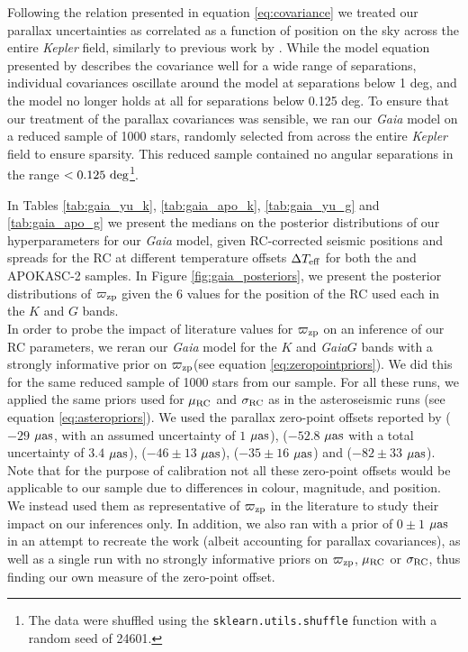 \documentclass[fleqn,usenatbib]{mnras}
\newcommand{\oozp}{\mbox{$\varpi_{\rm zp}$}\xspace}
\newcommand{\muas}{\mbox{$\mu \rm as$}\xspace}
\newcommand{\murc}{\mbox{$\mu_{\rm RC}$}\xspace}
\newcommand{\sigrc}{\mbox{$\sigma_{\rm RC}$}\xspace}
\newcommand{\kepler}{\emph{Kepler}\xspace}
\newcommand{\gaia}{\emph{Gaia}\xspace}
\newcommand{\up}[1]{#1}
\begin{document}
Following the relation presented in equation \ref{eq:covariance} \citep{art:lindegren+2018} we treated our parallax uncertainties as correlated as a function of position on the sky across the entire \kepler field, similarly to previous work by \cite{art:zinn+2018}. While the model equation presented by \cite{art:lindegren+2018} describes the covariance well for a wide range of separations, individual covariances oscillate around the model at separations below 1 deg, and the model no longer holds at all for separations below 0.125 deg. To ensure that our treatment of the parallax covariances was sensible, we ran our \gaia model on a reduced sample of 1000 stars, randomly selected from across the entire \kepler field to ensure sparsity. This reduced sample contained no angular separations in the range $< 0.125\ \rm deg$\footnote{The data were shuffled using the \texttt{sklearn.utils.shuffle} function with a random seed of 24601.}.

In Tables \ref{tab:gaia_yu_k}, \ref{tab:gaia_apo_k}, \ref{tab:gaia_yu_g} and \ref{tab:gaia_apo_g} we present the medians on the posterior distributions of our hyperparameters for our \gaia model, given RC-corrected seismic positions and spreads for the RC at different temperature offsets $\Delta T_{\rm eff}$ for both the  and APOKASC-2 samples. In Figure \ref{fig:gaia_posteriors}, we present the posterior distributions of \oozp given the 6 values for the position of the RC used each in the $K$ and $G$ bands.\\

In order to probe the impact of literature values for \oozp on an inference of our RC parameters, we reran our \gaia model for the $K$ and \gaia $G$ bands with a strongly informative prior on \oozp (see equation \ref{eq:zeropointpriors}). We did this for the same reduced sample of 1000 stars from our  sample. For all these runs, we applied the same priors used for \murc and \sigrc as in the asteroseismic runs (see equation \ref{eq:asteropriors}). We used the parallax zero-point offsets reported by \cite{art:lindegren+2018} ($-29$ \muas, with an assumed uncertainty of $1$ \muas), \cite{art:zinn+2018} ($-52.8$ \muas with a total uncertainty of $3.4$ \muas), \cite{art:riess+2018} ($-46 \pm 13$ \muas), \cite{art:sahlholdt+silvaaguirre2018} ($-35 \pm 16$ \muas) and \cite{art:stassun+torres2018} ($-82 \pm 33$ \muas). \up{Note that for the purpose of calibration not all these zero-point offsets would be applicable to our sample due to differences in colour, magnitude, and position. We instead used them as representative of \oozp in the literature to study their impact on our inferences only.} In addition, we also ran with a prior of $0 \pm 1$ \muas in an attempt to recreate the  work (albeit accounting for parallax covariances), as well as a single run with no strongly informative priors on \oozp, \murc or \sigrc, \up{thus finding our own measure of the zero-point offset.}
\end{document}
